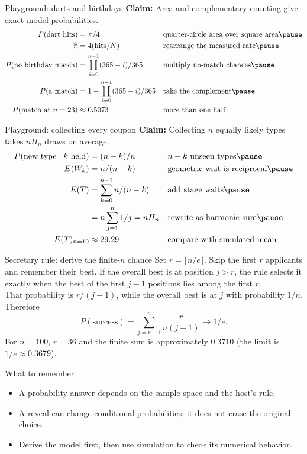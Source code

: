 \documentclass[aspectratio=169,10pt]{beamer}
\begin{document}
\begin{frame}{Playground: darts and birthdays}
\textbf{Claim:} Area and complementary counting give exact model probabilities.
\begin{align*}
P(\text{dart hits})&=\pi/4 &&\text{quarter-circle area over square area}\pause\\
\widehat\pi&=4(\text{hits}/N) &&\text{rearrange the measured rate}\pause\\
P(\text{no birthday match})&=\prod_{i=0}^{n-1}(365-i)/365 &&\text{multiply no-match chances}\pause\\
P(\text{a match})&=1-\prod_{i=0}^{n-1}(365-i)/365 &&\text{take the complement}\pause\\
P(\text{match at }n=23)&\approx0.5073 &&\text{more than one half}
\end{align*}
\end{frame}
\begin{frame}{Playground: collecting every coupon}
\textbf{Claim:} Collecting $n$ equally likely types takes $nH_n$ draws on average.
\begin{align*}
P(\text{new type}\mid k\text{ held})&=(n-k)/n &&\text{$n-k$ unseen types}\pause\\
E(W_k)&=n/(n-k) &&\text{geometric wait is reciprocal}\pause\\
E(T)&=\sum_{k=0}^{n-1}n/(n-k) &&\text{add stage waits}\pause\\
&=n\sum_{j=1}^n1/j=nH_n &&\text{rewrite as harmonic sum}\pause\\
E(T)_{n=10}&\approx29.29 &&\text{compare with simulated mean}
\end{align*}
\end{frame}
\begin{frame}{Secretary rule: derive the finite-$n$ chance}
Set $r=\lfloor n/e\rfloor$. Skip the first $r$ applicants and remember their best. If the overall best is at position $j>r$, the rule selects it exactly when the best of the first $j-1$ positions lies among the first $r$.\\That probability is $r/(j-1)$, while the overall best is at $j$ with probability $1/n$. Therefore
\[P(\text{success})=\sum_{j=r+1}^{n}\frac{r}{n(j-1)}\longrightarrow 1/e.\]
For $n=100$, $r=36$ and the finite sum is approximately $0.3710$ (the limit is $1/e\approx0.3679$).
\end{frame}
\begin{frame}{What to remember}
\begin{itemize}\item A probability answer depends on the sample space and the host's rule.\item A reveal can change conditional probabilities; it does not erase the original choice.\item Derive the model first, then use simulation to check its numerical behavior.\end{itemize}\end{frame}
\end{document}
